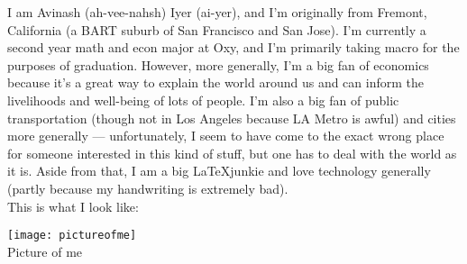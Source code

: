 \documentclass[12pt]{extarticle}
\title{}
\author{Avinash Iyer}
\date{}
\begin{document}
{
I am Avinash (ah-vee-nahsh) Iyer (ai-yer), and I'm originally from Fremont, California (a BART suburb of San Francisco and San Jose). I'm currently a second year math and econ major at Oxy, and I'm primarily taking macro for the purposes of graduation. However, more generally, I'm a big fan of economics because it's a great way to explain the world around us and can inform the livelihoods and well-being of lots of people. I'm also a big fan of public transportation (though not in Los Angeles because LA Metro is awful) and cities more generally --- unfortunately, I seem to have come to the exact wrong place for someone interested in this kind of stuff, but one has to deal with the world as it is. Aside from that, I am a big \LaTeX junkie and love technology generally (partly because my handwriting is extremely bad).\\

\noindent This is what I look like:
  \begin{center}
    \texttt{[image: pictureofme]}\\
    Picture of me
  \end{center}
}
\end{document}
